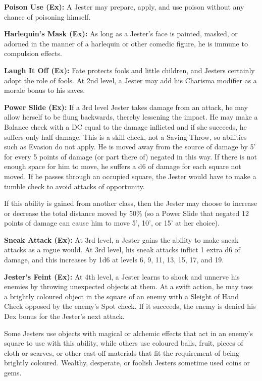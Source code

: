 \textbf{Poison Use (Ex):} A Jester may prepare, apply, and use poison without any chance of poisoning himself.

\textbf{Harlequin's Mask (Ex):} As long as a Jester's face is painted, masked, or adorned in the manner of a harlequin or other comedic figure, he is immune to compulsion effects.

\textbf{Laugh It Off (Ex):} Fate protects fools and little children, and Jesters certainly adopt the role of fools. At 2nd level, a Jester may add his Charisma modifier as a morale bonus to his saves.

\textbf{Power Slide (Ex):} If a 3rd level Jester takes damage from an attack, he may allow herself to be flung backwards, thereby lessening the impact. He may make a Balance check with a DC equal to the damage inflicted and if she succeeds, he suffers only half damage. This is a skill check, not a Saving Throw, so abilities such as Evasion do not apply. He is moved away from the source of damage by 5' for every 5 points of damage (or part there of) negated in this way. If there is not enough space for him to move, he suffers a d6 of damage for each square not moved. If he passes through an occupied square, the Jester would have to make a tumble check to avoid attacks of opportunity.

If this ability is gained from another class, then the Jester may choose to increase or decrease the total distance moved by 50\% (so a Power Slide that negated 12 points of damage can cause him to move 5', 10', or 15' at her choice).

\textbf{Sneak Attack (Ex):} At 3rd level, a Jester gains the ability to make sneak attacks as a rogue would. At 3rd level, his sneak attacks inflict 1 extra d6 of damage, and this increases by 1d6 at levels 6, 9, 11, 13, 15, 17, and 19.

\textbf{Jester's Feint (Ex):} At 4th level, a Jester learns to shock and unnerve his enemies by throwing unexpected objects at them. At a swift action, he may toss a brightly coloured object in the square of an enemy with a Sleight of Hand Check opposed by the enemy's Spot check. If it succeeds, the enemy is denied his Dex bonus for the Jester's next attack.

Some Jesters use objects with magical or alchemic effects that act in an enemy's square to use with this ability, while others use coloured balls, fruit, pieces of cloth or scarves, or other cast-off materials that fit the requirement of being brightly coloured. Wealthy, desperate, or foolish Jesters sometime used coins or gems.

